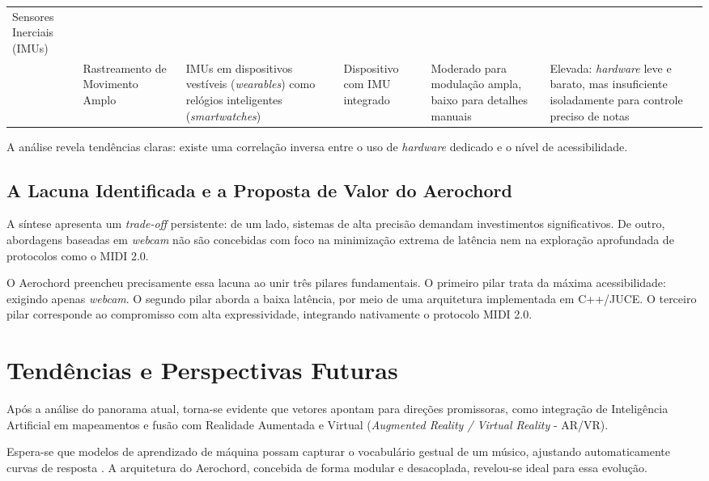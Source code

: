 \begin{table}[ht]
{\begin{tabular}{p{4.2cm} p{2.8cm} p{3.2cm} p{2.8cm} p{3.8cm} p{3.8cm}}
        \midrule
        Sensores Inerciais (IMUs)\\ \cite{dipietro2008survey} & Rastreamento de Movimento Amplo & IMUs em dispositivos vestíveis (\textit{wearables}) como relógios inteligentes (\textit{smartwatches}) & Dispositivo com IMU integrado & Moderado para modulação ampla, baixo para detalhes manuais & Elevada: \textit{hardware} leve e barato, mas insuficiente isoladamente para controle preciso de notas \\
        \bottomrule
    \end{tabular}%
    }
\end{table}

A análise revela tendências claras: existe uma correlação inversa entre o uso de \textit{hardware} dedicado e o nível de acessibilidade.

\subsection{A Lacuna Identificada e a Proposta de Valor do Aerochord}
\label{subsec:lacuna_proposta}

A síntese apresenta um \textit{trade-off} persistente: de um lado, sistemas de alta precisão demandam investimentos significativos. De outro, abordagens baseadas em \textit{webcam} não são concebidas com foco na minimização extrema de latência nem na exploração aprofundada de protocolos como o MIDI 2.0.

O Aerochord preencheu precisamente essa lacuna ao unir três pilares fundamentais. O primeiro pilar trata da máxima acessibilidade: exigindo apenas \textit{webcam}. O segundo pilar aborda a baixa latência, por meio de uma arquitetura implementada em C++/JUCE. O terceiro pilar corresponde ao compromisso com alta expressividade, integrando nativamente o protocolo MIDI 2.0. 

\section{Tendências e Perspectivas Futuras}
\label{sec:tendencias_perspectivas}

Após a análise do panorama atual, torna-se evidente que vetores apontam para direções promissoras, como integração de Inteligência Artificial em mapeamentos e fusão com Realidade Aumentada e Virtual (\textit{Augmented Reality / Virtual Reality} - AR/VR).

Espera-se que modelos de aprendizado de máquina possam capturar o vocabulário gestual de um músico, ajustando automaticamente curvas de resposta \cite{caramiaux2014mapping}. A arquitetura do Aerochord, concebida de forma modular e desacoplada, revelou-se ideal para essa evolução.

